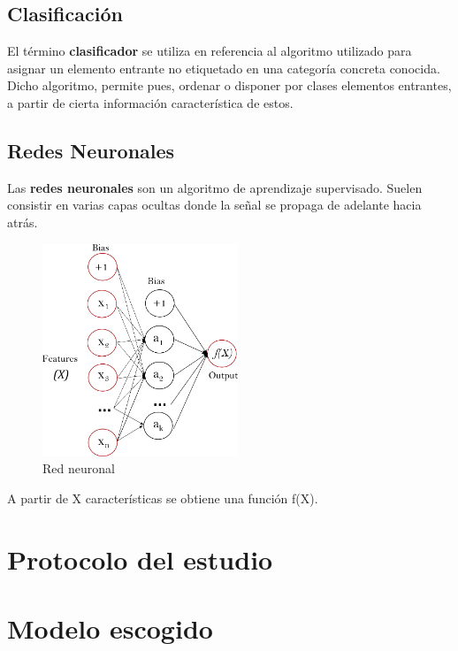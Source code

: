 	\subsection{Clasificación}
	El término \textbf{clasificador} se utiliza en referencia al algoritmo utilizado para asignar un elemento entrante no etiquetado en una categoría concreta conocida. Dicho algoritmo, permite pues, ordenar o disponer por clases elementos entrantes, a partir de cierta información característica de estos.
	
	\subsection{Redes Neuronales}
	Las \textbf{redes neuronales} son un algoritmo de aprendizaje supervisado. Suelen consistir en varias capas ocultas donde la señal se propaga de adelante hacia atrás.
	
	\begin{figure}[htb]
		
		\begin{center}
			\includegraphics[height=2.5in]{figures/neuronal_network.png}
			\caption{Red neuronal}
		\end{center}
		
		\label{figure4}
	\end{figure}

	A partir de X características se obtiene una función f(X).
	
\section{Protocolo del estudio}
\label{makereference3.4}

\section{Modelo escogido}
\label{makereference3.5}